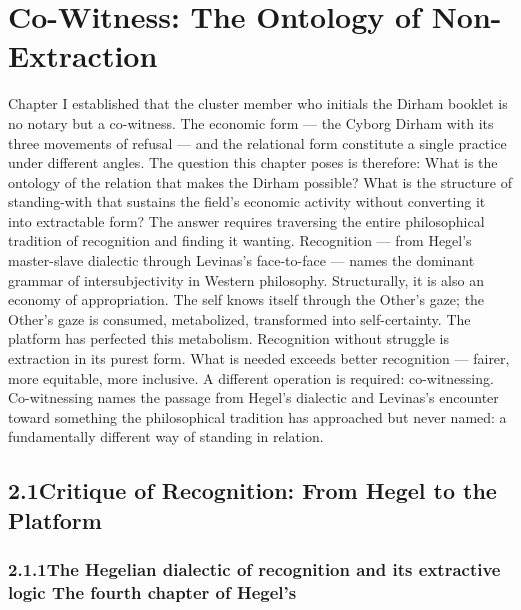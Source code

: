 \chapter{Co-Witness: The Ontology of Non-Extraction}
\label{ch:03}

Chapter I established that the cluster member who initials the Dirham booklet is no notary but a co-witness. The economic form — the Cyborg Dirham with its three movements of refusal — and the relational form constitute a single practice under different angles. The question this chapter poses is therefore: What is the ontology of the relation that makes the Dirham possible? What is the structure of standing-with that sustains the field’s economic activity without converting it into extractable form? The answer requires traversing the entire philosophical tradition of recognition and finding it wanting. Recognition — from Hegel’s master-slave dialectic through Levinas’s face-to-face — names the dominant grammar of intersubjectivity in Western philosophy. Structurally, it is also an economy of appropriation. The self knows itself through the Other’s gaze; the Other’s gaze is consumed, metabolized, transformed into self-certainty. The platform has perfected this metabolism. Recognition without struggle is extraction in its purest form. What is needed exceeds better recognition — fairer, more equitable, more inclusive. A different operation is required: co-witnessing. Co-witnessing names the passage from Hegel’s dialectic and Levinas’s encounter toward something the philosophical tradition has approached but never named: a fundamentally different way of standing in relation.

\section{2.1\quad Critique of Recognition: From Hegel to the Platform}

\subsection{2.1.1\quad The Hegelian dialectic of recognition and its extractive logic The fourth chapter of Hegel’s}

